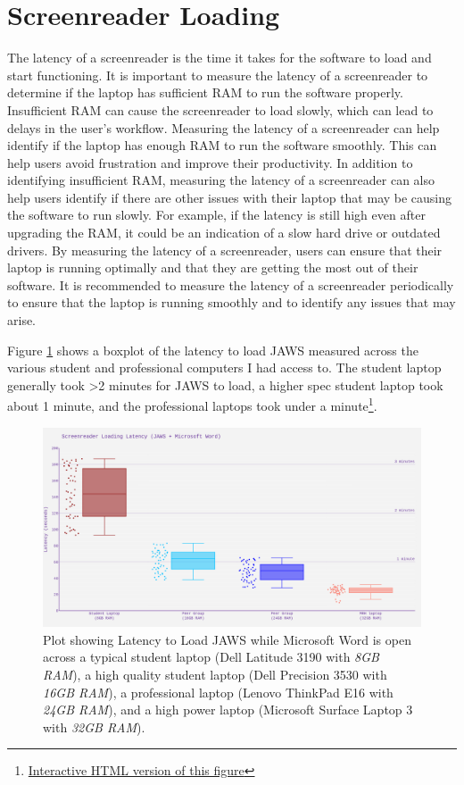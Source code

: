 \documentclass[14pt,letterpaper,twoside]{extreport}
\begin{document}
\pagebreak \hypertarget{screenreader-loading}{}\section{Screenreader Loading}\label{screenreader-loading}
The latency of a screenreader is the time it takes for the software to load and start functioning. It is important to measure the latency of a screenreader to determine if the laptop has sufficient RAM to run the software properly. Insufficient RAM can cause the screenreader to load slowly, which can lead to delays in the user’s workflow. Measuring the latency of a screenreader can help identify if the laptop has enough RAM to run the software smoothly. This can help users avoid frustration and improve their productivity. In addition to identifying insufficient RAM, measuring the latency of a screenreader can also help users identify if there are other issues with their laptop that may be causing the software to run slowly. For example, if the latency is still high even after upgrading the RAM, it could be an indication of a slow hard drive or outdated drivers. By measuring the latency of a screenreader, users can ensure that their laptop is running optimally and that they are getting the most out of their software. It is recommended to measure the latency of a screenreader periodically to ensure that the laptop is running smoothly and to identify any issues that may arise.

Figure \ref{fig:figure 1} shows a boxplot of the latency to load JAWS measured across the various student and professional computers I had access to. The student laptop generally took \textgreater2 minutes for JAWS to load, a higher spec student laptop took about 1 minute, and the professional laptops took under a minute\footnote{\href{https://github.com/mrhunsaker/MiscResources/raw/main/ComputerRBDisplaySpecsTVIFig1.html}{Interactive HTML version of this figure}}.
	
\begin{figure}[H]
	\centering
	\includegraphics[width=\textwidth]{images/ComputerRBDisplaySpecsTVIFig1.png}
         
	\caption[Latency to Load JAWS]{Plot showing Latency to Load JAWS while Microsoft Word is open across a typical student laptop (Dell Latitude 3190 with \textit{8GB RAM}), a high quality student laptop (Dell Precision 3530 with \textit{16GB RAM}), a professional laptop (Lenovo ThinkPad E16 with \textit{24GB RAM}), and a high power laptop (Microsoft Surface Laptop 3 with \textit{32GB RAM}).}\label{fig:figure 1}
\end{figure}
\end{document}
